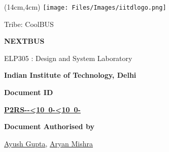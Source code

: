 \renewcommand{\thefootnote}{\alph{footnote}}
\def\mydate{\leavevmode\hbox{\the\year-\twodigits\month-\twodigits\day}}
\def\twodigits#1{\ifnum#1<10 0\fi\the#1}
\begin{titlepage}

       \begin{textblock*}{2cm}(14cm,4cm)
       \texttt{[image: Files/Images/iitdlogo.png]}
       \end{textblock*}
            \vskip1in
	        \raggedright
            \vskip3in
              {%
				\fontsize{20}{28}
				\boldmath
				\sffamily
				 Tribe: CoolBUS
				\par
            }
             \vskip0.2in
           
             {
				\Large
				\fontsize{28}{32}
				\bfseries
				\boldmath
				\sffamily
                NEXTBUS
				\par
            }
            \vskip0.1in
             {
				\fontsize{18}{18}
				\sffamily
                
				\par
            }
            \vskip0.1in
             {
				\fontsize{16}{16}
				\sffamily
                ELP305 : Design and System Laboratory
				\par
            }
            \vskip0.1in
             {
				\fontsize{16}{14}
				\sffamily
                \textbf{Indian Institute of Technology, Delhi}
                \par
            }
    \vspace{0.85in}
    {
        \normalsize
        \sffamily
        \textbf{\textcolor{tuberlindarkgray}{Document ID}}\par \vspace{0.12cm}
                \hyperlink{Target_DocInfo}{\textbf{P2RS-\mydate-}}\par
                \vspace{0.24cm}  
        \textbf{\textcolor{tuberlindarkgray}{Document Authorised by}}\par \vspace{0.12cm}
        {\href{https://www.linkedin.com/in/ayush-gupta-undergraduate/}{Ayush Gupta}, \href{http://linkedin.com/in/aryan-mishra-04j}{Aryan Mishra}}

}
\end{titlepage}
